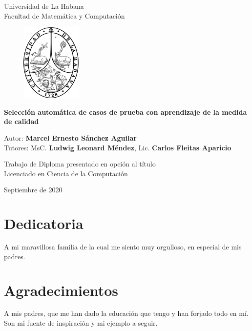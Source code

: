 \documentclass[a4paper,openright,11pt,oneside]{book}
\begin{document}
	\begin{titlepage}
		\begin{center}
			\vspace*{-1in}
			Universidad de La Habana \\
			Facultad de Matemática y Computación \\
			\vspace*{0.15in}
			\begin{figure}[htb]
				\begin{center}
					\includegraphics[width=3cm]{./Graphics/uhlogo.pdf}
				\end{center}
			\end{figure}
			
			\vspace*{0.3in}
			\begin{large}
			\textbf{Selección automática de casos de prueba con aprendizaje de la medida de calidad} \\
			\end{large}
			\vspace*{0.6in}
			Autor: \textbf{Marcel Ernesto Sánchez Aguilar} \\
			Tutores: MsC. \textbf{Ludwig Leonard Méndez}, Lic. \textbf{Carlos Fleitas Aparicio}
			
			\vspace*{0.4in}
			Trabajo de Diploma presentado en opción al título\\
			Licenciado en Ciencia de la Computación
			
			\vspace*{0.5in}
			Septiembre de 2020
			
		\end{center}
	\end{titlepage}
\chapter*{Dedicatoria}
A mi maravillosa familia de la cual me siento muy orgulloso, en especial de mis padres.

\chapter*{Agradecimientos}
	A mis padres, que me han dado la educación que tengo y han forjado todo en mí. Son mi fuente de inspiración y mi ejemplo a seguir.
	
\end{document}
